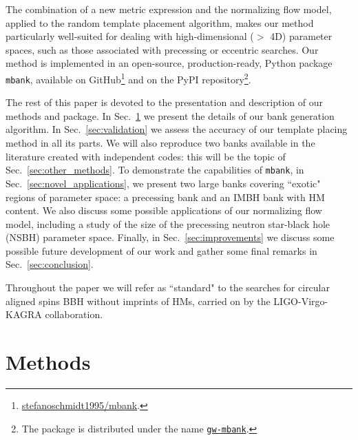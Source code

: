 \documentclass[twocolumn,showpacs,preprintnumbers,nofootinbib,prd,
superscriptaddress,10pt]{revtex4-2}
\begin{document}
The combination of a new metric expression and the normalizing flow model, applied to the random template placement algorithm, makes our method particularly well-suited for dealing with high-dimensional ($>$ 4D) parameter spaces, such as those associated with precessing or eccentric searches.
Our method is implemented in an open-source, production-ready, Python package \texttt{mbank}, available on GitHub\footnote{
\href{https://github.com/stefanoschmidt1995/mbank}{stefanoschmidt1995/mbank}.}
and on the PyPI repository\footnote{
The package is distributed under the name \texttt{\href{https://pypi.org/project/gw-mbank/}{gw-mbank}}.
}.

The rest of this paper is devoted to the presentation and description of our methods and package.
In Sec.~\ref{sec:methods} we present the details of our bank generation algorithm.
In Sec.~\ref{sec:validation} we assess the accuracy of our template placing method in all its parts.
We will also reproduce two banks available in the literature \cite{Harry:2017weg, Sakon:2022ibh} created with independent codes: this will be the topic of Sec.~\ref{sec:other_methods}.
To demonstrate the capabilities of \texttt{mbank}, in Sec.~\ref{sec:novel_applications}, we present two large banks covering ``exotic" regions of parameter space: a precessing bank and an IMBH bank with HM content. We also discuss some possible applications of our normalizing flow model, including a study of the size of the precessing neutron star-black hole (NSBH) parameter space.
Finally, in Sec.~\ref{sec:improvements} we discuss some possible future development of our work and gather some final remarks in Sec.~\ref{sec:conclusion}.

Throughout the paper we will refer as ``standard" to the searches for circular aligned spins BBH without imprints of HMs, carried on by the LIGO-Virgo-KAGRA collaboration.

\section{Methods} \label{sec:methods}
\end{document}
